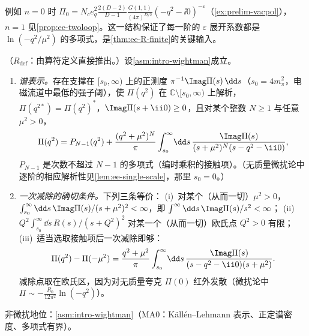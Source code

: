 例如 $n=0$ 时 $\Pi_0=N_ce_q^2\frac{2(D-2)}{D-1}\frac{G(1,1)}{(4\pi)^{D/2}}(-q^2-\ii0)^{-\varepsilon}$（\cref{ex:prelim-vacpol}），$n=1$ 见\cref{prop:ee-twoloop}。这一结构保证了每一阶的 $\varepsilon$ 展开系数都是 $\ln(-q^2/\mu^2)$ 的多项式，是\cref{thm:ee-R-finite}的关键输入。

\begin{proposition}\label{prop:ee-analytic}
（$R_{\mathrm{def}}$：由算符定义直接推出。）设\cref{asm:intro-wightman}成立。
\begin{enumerate}[label=(\alph*),leftmargin=2em,itemsep=1pt,topsep=2pt]
\item \emph{谱表示。}存在支撑在 $[s_0,\infty)$ 上的正测度 $\pi^{-1}\Imag\Pi(s)\,\dd s$（$s_0=4m_\pi^2$，电磁流道中最低的强子阈），使 $\Pi(q^2)$ 在 $\mathbb C\setminus[s_0,\infty)$ 上解析，$\Pi(q^{2*})=\Pi(q^2)^*$，$\Imag\Pi(s+\ii0)\ge0$，且对某个整数 $N\ge1$ 与任意 $\mu^2>0$，
\begin{equation}\label{eq:ee-KL}
\Pi(q^2)=P_{N-1}(q^2)+\frac{(q^2+\mu^2)^N}{\pi}\int_{s_0}^\infty\!\dd s\,\frac{\Imag\Pi(s)}{(s+\mu^2)^N(s-q^2-\ii0)} ,
\end{equation}
$P_{N-1}$ 是次数不超过 $N-1$ 的多项式（编时乘积的接触项）。（无质量微扰论中逐阶的相应解析性见\cref{lem:ee-single-scale}，那里 $s_0=0$。）
\item \emph{一次减除的确切条件。}下列三条等价：
(i)~对某个（从而一切）$\mu^2>0$，$\int_{s_0}^\infty\dd s\,\Imag\Pi(s)/(s+\mu^2)^2<\infty$，即 $\int^\infty\dd s\,\Imag\Pi(s)/s^2<\infty$；
(ii)~$Q^2\int_{s_0}^\infty\dd s\,R(s)/(s+Q^2)^2$ 对某一个（从而一切）欧氏点 $Q^2>0$ 有限；
(iii)~适当选取接触项后一次减除即够：
\begin{equation}\label{eq:ee-once}
\Pi(q^2)-\Pi(-\mu^2)=\frac{q^2+\mu^2}{\pi}\int_{s_0}^\infty\!\dd s\,\frac{\Imag\Pi(s)}{(s-q^2-\ii0)(s+\mu^2)} .
\end{equation}
减除点取在欧氏区，因为对无质量夸克 $\Pi(0)$ 红外发散（微扰论中 $\Pi\sim-\frac{R_0}{12\pi^2}\ln(-q^2)$）。
\end{enumerate}
非微扰地位：\cref{asm:intro-wightman}（MA0：Källén--Lehmann 表示、正定谱密度、多项式有界）。
\end{proposition}
